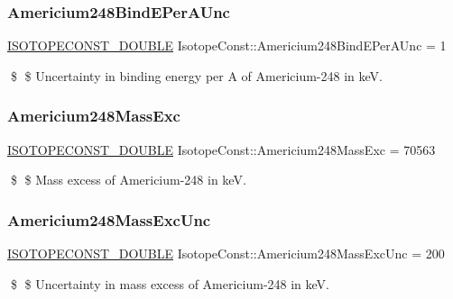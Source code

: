 \subsubsection{\texorpdfstring{Americium248\+Bind\+E\+Per\+A\+Unc}{Americium248BindEPerAUnc}}
{\footnotesize\ttfamily \mbox{\hyperlink{group___isotope_const-_macros_ga8f45a7272ce02c0b4c65c44636ed719a}{I\+S\+O\+T\+O\+P\+E\+C\+O\+N\+S\+T\+\_\+\+D\+O\+U\+B\+LE}} Isotope\+Const\+::\+Americium248\+Bind\+E\+Per\+A\+Unc = 1}

\$ \$ Uncertainty in binding energy per A of Americium-\/248 in keV. \mbox{\label{group___isotope_const-_americium-_am248_gab39ea355580113ba70c473df72f3eabf}} 
\subsubsection{\texorpdfstring{Americium248\+Mass\+Exc}{Americium248MassExc}}
{\footnotesize\ttfamily \mbox{\hyperlink{group___isotope_const-_macros_ga8f45a7272ce02c0b4c65c44636ed719a}{I\+S\+O\+T\+O\+P\+E\+C\+O\+N\+S\+T\+\_\+\+D\+O\+U\+B\+LE}} Isotope\+Const\+::\+Americium248\+Mass\+Exc = 70563}

\$ \$ Mass excess of Americium-\/248 in keV. \mbox{\label{group___isotope_const-_americium-_am248_ga5d1babd6ba9f3f090e32614fcf7bb794}} 
\subsubsection{\texorpdfstring{Americium248\+Mass\+Exc\+Unc}{Americium248MassExcUnc}}
{\footnotesize\ttfamily \mbox{\hyperlink{group___isotope_const-_macros_ga8f45a7272ce02c0b4c65c44636ed719a}{I\+S\+O\+T\+O\+P\+E\+C\+O\+N\+S\+T\+\_\+\+D\+O\+U\+B\+LE}} Isotope\+Const\+::\+Americium248\+Mass\+Exc\+Unc = 200}

\$ \$ Uncertainty in mass excess of Americium-\/248 in keV. \mbox{\label{group___isotope_const-_americium-_am248_gaa3a76013a86e39233ed9c74f9b20fe17}} 
